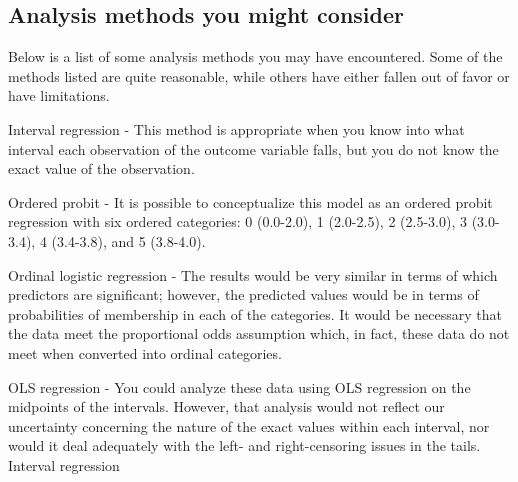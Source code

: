 \documentclass[a4paper,12pt]{article}
\begin{document}
\subsection{Analysis methods you might consider}

Below is a list of some analysis methods you may have encountered. Some of the methods listed are quite reasonable, while others have either fallen out of favor or have limitations.

Interval regression - This method is appropriate when you know into what interval each observation of the outcome variable falls, but you do not know the exact value of the observation.

Ordered probit - It is possible to conceptualize this model as an ordered probit regression with six ordered categories: 0 (0.0-2.0), 1 (2.0-2.5), 2 (2.5-3.0), 3 (3.0-3.4), 4 (3.4-3.8), and 5 (3.8-4.0).

Ordinal logistic regression - The results would be very similar in terms of which predictors are significant; however, the predicted values would be in terms of probabilities of membership in each of the categories. It would be necessary that the data meet the proportional odds assumption which, in fact, these data do not meet when converted into ordinal categories.

OLS regression - You could analyze these data using OLS regression on the midpoints of the intervals. However, that analysis would not reflect our uncertainty concerning the nature of the exact values within each interval, nor would it deal adequately with the left- and right-censoring issues in the tails.
Interval regression
\end{document}
